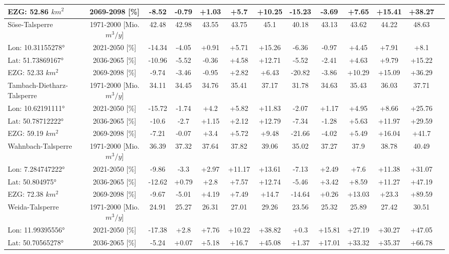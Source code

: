 \begin{longtable}{@{\extracolsep{\fill}}lc|ccccc||cccccc}
EZG: 52.86 $km^2$ & 2069-2098 [\%]  & -8.52 & -0.79 & +1.03 & +5.7 & +10.25 & -15.23 & -3.69 & +7.65 & +15.41 & +38.27 & \\ 
\hline 
Söse-Talsperre & 1971-2000 [Mio. $m^3/y$]  & 42.48 & 42.98 & 43.55 & 43.75 & 45.1 & 40.18 & 43.13 & 43.62 & 44.22 & 48.63 & \\ 
\cline{2-13} 
Lon: 10.31155278° & 2021-2050 [\%]  & -14.34 & -4.05 & +0.91 & +5.71 & +15.26 & -6.36 & -0.97 & +4.45 & +7.91 & +8.1 & \\ 
Lat: 51.73869167° & 2036-2065 [\%]  & -10.96 & -5.52 & -0.36 & +4.58 & +12.71 & -5.52 & -2.41 & +4.63 & +9.79 & +15.22 & \\ 
EZG: 52.33 $km^2$ & 2069-2098 [\%]  & -9.74 & -3.46 & -0.95 & +2.82 & +6.43 & -20.82 & -3.86 & +10.29 & +15.09 & +36.29 & \\ 
\hline 
Tambach-Dietharz-Talsperre & 1971-2000 [Mio. $m^3/y$]  & 34.11 & 34.45 & 34.76 & 35.41 & 37.17 & 31.78 & 34.63 & 35.43 & 36.03 & 37.71 & \\ 
\cline{2-13} 
Lon: 10.62191111° & 2021-2050 [\%]  & -15.72 & -1.74 & +4.2 & +5.82 & +11.83 & -2.07 & +1.17 & +4.95 & +8.66 & +25.76 & \\ 
Lat: 50.78712222° & 2036-2065 [\%]  & -10.6 & -2.7 & +1.15 & +2.12 & +12.79 & -7.34 & -1.28 & +5.63 & +11.97 & +29.59 & \\ 
EZG: 59.19 $km^2$ & 2069-2098 [\%]  & -7.21 & -0.07 & +3.4 & +5.72 & +9.48 & -21.66 & -4.02 & +5.49 & +16.04 & +41.7 & \\ 
\hline 
Wahnbach-Talsperre & 1971-2000 [Mio. $m^3/y$]  & 36.39 & 37.32 & 37.64 & 37.82 & 39.06 & 35.02 & 37.27 & 37.9 & 38.78 & 40.49 & \\ 
\cline{2-13} 
Lon: 7.284747222° & 2021-2050 [\%]  & -9.86 & -3.3 & +2.97 & +11.17 & +13.61 & -7.13 & +2.49 & +7.6 & +11.38 & +31.07 & \\ 
Lat: 50.804975° & 2036-2065 [\%]  & -12.62 & +0.79 & +2.8 & +7.57 & +12.74 & -5.46 & +3.42 & +8.59 & +11.27 & +47.19 & \\ 
EZG: 72.38 $km^2$ & 2069-2098 [\%]  & -9.67 & -5.01 & +4.19 & +7.49 & +14.7 & -14.64 & +0.26 & +13.03 & +23.3 & +89.59 & \\ 
\hline 
Weida-Talsperre & 1971-2000 [Mio. $m^3/y$]  & 24.91 & 25.27 & 26.31 & 27.01 & 29.26 & 23.56 & 25.32 & 25.89 & 27.42 & 30.51 & \\ 
\cline{2-13} 
Lon: 11.99395556° & 2021-2050 [\%]  & -17.38 & +2.8 & +7.76 & +10.22 & +38.82 & +0.3 & +15.81 & +27.19 & +30.27 & +47.05 & \\ 
Lat: 50.70565278° & 2036-2065 [\%]  & -5.24 & +0.07 & +5.18 & +16.7 & +45.08 & +1.37 & +17.01 & +33.32 & +35.37 & +66.78 & \\ 

\end{longtable}
